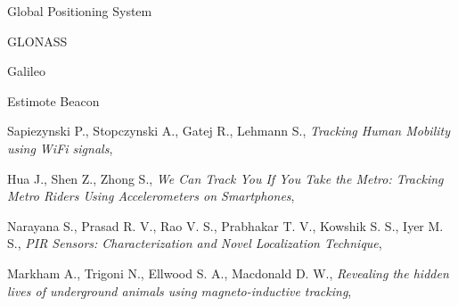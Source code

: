 \begin{thebibliography}{99}
  Global Positioning System
  
  GLONASS

  Galileo

  
  Estimote Beacon
  
   Sapiezynski P., Stopczynski A., Gatej R., Lehmann S.,
  \textit{Tracking Human Mobility using WiFi signals}, 
  
   Hua J., Shen Z., Zhong S., 
  \textit{We Can Track You If You Take the Metro: Tracking Metro Riders Using Accelerometers on Smartphones}, 
  
   Narayana S., Prasad R. V., Rao V. S., Prabhakar  T. V., Kowshik S. S., Iyer M. S.,
  \textit{PIR Sensors: Characterization and Novel Localization Technique}, 
  
   Markham A., Trigoni N., Ellwood S. A., Macdonald D. W.,
  \textit{Revealing the hidden lives of underground animals using
magneto-inductive tracking}, 

  
\end{thebibliography}
